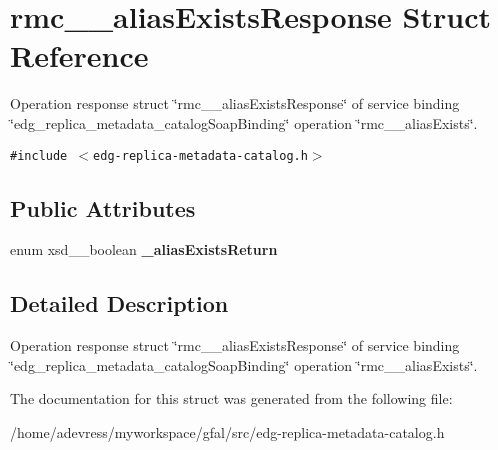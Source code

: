 \section{rmc\_\-\_\-alias\-Exists\-Response Struct Reference}
\label{structrmc____aliasExistsResponse}
Operation response struct \char`\"{}rmc\_\-\_\-alias\-Exists\-Response\char`\"{} of service binding \char`\"{}edg\_\-replica\_\-metadata\_\-catalog\-Soap\-Binding\char`\"{} operation \char`\"{}rmc\_\-\_\-alias\-Exists\char`\"{}.  


{\tt \#include $<$edg-replica-metadata-catalog.h$>$}

\subsection*{Public Attributes}
\begin{CompactItemize}
\item 
enum xsd\_\-\_\-boolean \textbf{\_\-alias\-Exists\-Return}\label{structrmc____aliasExistsResponse_06918aeebfd1263a8fa5eb0db5ab43c6}

\end{CompactItemize}


\subsection{Detailed Description}
Operation response struct \char`\"{}rmc\_\-\_\-alias\-Exists\-Response\char`\"{} of service binding \char`\"{}edg\_\-replica\_\-metadata\_\-catalog\-Soap\-Binding\char`\"{} operation \char`\"{}rmc\_\-\_\-alias\-Exists\char`\"{}. 



The documentation for this struct was generated from the following file:\begin{CompactItemize}
\item 
/home/adevress/myworkspace/gfal/src/edg-replica-metadata-catalog.h\end{CompactItemize}
